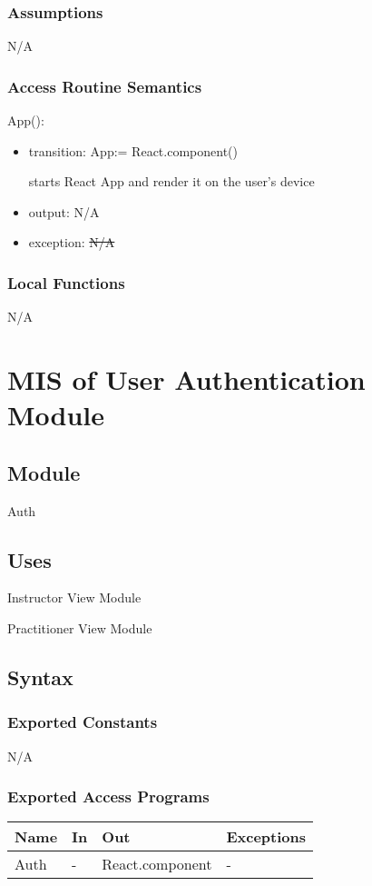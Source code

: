 \documentclass[12pt, titlepage]{article}
\newcommand{\rt}[1]{\textcolor{red}{#1}}
\begin{document}
\subsubsection{Assumptions}
N/A

\subsubsection{Access Routine Semantics}

\noindent App():
\begin{itemize}
\item transition: App:= React.component()

  starts React App and render it on the user's device
\item output: N/A
\item exception: \sout{N/A} \rt{}
\end{itemize}

\subsubsection{Local Functions}
N/A

\section{MIS of User Authentication Module} \label{sec:userauth}

\subsection{Module}
Auth

\subsection{Uses}
Instructor View Module

Practitioner View Module

\subsection{Syntax}

\subsubsection{Exported Constants}
N/A

\subsubsection{Exported Access Programs}
\begin{table}[h!]
  \centering
  \begin{tabular}{llll}
    \hline
    \textbf{Name} & \textbf{In} & \textbf{Out}          & \textbf{Exceptions} \\
    \hline
    Auth    & -     & React.component & -             \\
    \hline
  \end{tabular}
\end{table}
\end{document}
